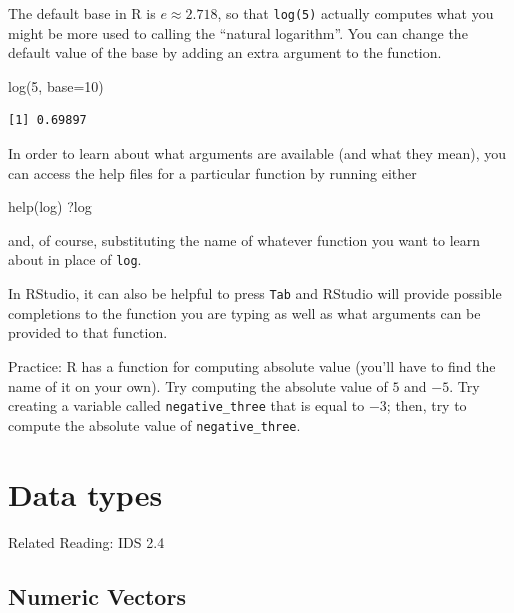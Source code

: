 \documentclass[
  letterpaper,
  DIV=11,
  numbers=noendperiod]{scrreprt}
\newenvironment{Shaded}{\begin{snugshade}}{\end{snugshade}}
\newcommand{\AttributeTok}[1]{\textcolor[rgb]{0.40,0.45,0.13}{#1}}
\newcommand{\DecValTok}[1]{\textcolor[rgb]{0.68,0.00,0.00}{#1}}
\newcommand{\FunctionTok}[1]{\textcolor[rgb]{0.28,0.35,0.67}{#1}}
\newcommand{\NormalTok}[1]{\textcolor[rgb]{0.00,0.23,0.31}{#1}}
\begin{document}
The default base in R is \(e \approx 2.718\), so that \texttt{log(5)}
actually computes what you might be more used to calling the ``natural
logarithm''. You can change the default value of the base by adding an
extra argument to the function.

\begin{Shaded}
\begin{Highlighting}[]
\FunctionTok{log}\NormalTok{(}\DecValTok{5}\NormalTok{, }\AttributeTok{base=}\DecValTok{10}\NormalTok{)}
\end{Highlighting}
\end{Shaded}

\begin{verbatim}
[1] 0.69897
\end{verbatim}

In order to learn about what arguments are available (and what they
mean), you can access the help files for a particular function by
running either

\begin{Shaded}
\begin{Highlighting}[]
\FunctionTok{help}\NormalTok{(log)}
\NormalTok{?log}
\end{Highlighting}
\end{Shaded}

and, of course, substituting the name of whatever function you want to
learn about in place of \texttt{log}.

In RStudio, it can also be helpful to press \texttt{Tab} and RStudio
will provide possible completions to the function you are typing as well
as what arguments can be provided to that function.

{Practice:} R has a function for computing absolute value (you'll have
to find the name of it on your own). Try computing the absolute value of
\(5\) and \(-5\). Try creating a variable called
\texttt{negative\_three} that is equal to \(-3\); then, try to compute
the absolute value of \texttt{negative\_three}.

\section{Data types}\label{data-types}

Related Reading: IDS 2.4

\subsection{Numeric Vectors}\label{numeric-vectors}
\end{document}
